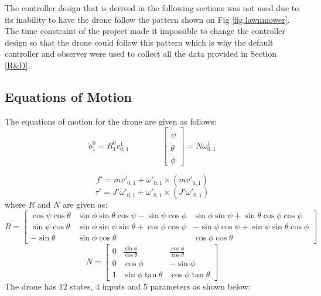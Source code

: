 The controller design that is derived in the following sections was not used due to its inability to have the drone follow the pattern shown on Fig \ref{fig:lawnmower}. The time constraint of the project made it impossible to change the controller design so that the drone could follow this pattern which is why the default controller and observer were used to collect all the data provided in Section \ref{R&D}.

\subsection{Equations of Motion}
The equations of motion for the drone are given as follows:
\begin{equation}
    \label{eqt 1}
    \dot{o}_{1}^{0} = R_{1}^{0}v_{0,1}^{1}
    \qquad\qquad
    \begin{bmatrix}
    \dot{\psi} \\ \dot{\theta} \\ \dot{\phi}
    \end{bmatrix} = N\omega_{0,1}^{1}
\end{equation}

\begin{equation}
    \label{eqt 2}
    f' = m\dot{v}'_{0,1} + \omega'_{0,1}\times (mv'_{0,1})
\end{equation}
\begin{equation}
    \label{eqt 3}
    \tau' = J'\dot{\omega}'_{0,1} + \omega'_{0,1}\times (J'\omega'_{0,1})
\end{equation}
where $R$ and $N$ are given as:
\begin{equation}
    R = \begin{bmatrix}
    \cos{\psi}\cos{\theta} & \sin{\phi}\sin{\theta}\cos{\psi}-\sin{\psi}\cos{\phi} & \sin{\phi}\sin{\psi}+\sin{\theta}\cos{\phi}\cos{\psi} \\
    \sin{\psi}\cos{\theta} & 
    \sin{\phi}\sin{\psi}\sin{\theta}+\cos{\phi}\cos{\psi} & -\sin{\phi}\cos{\psi}+\sin{\psi}\sin{\theta}\cos{\phi} \\ 
    -\sin{\theta} & \sin{\phi}\cos{\theta} & \cos{\phi}\cos{\theta}
    \end{bmatrix}
\end{equation}
\begin{equation}
    N = \begin{bmatrix}
    0 & \frac{\sin{\phi}}{\cos{\theta}} & \frac{\cos{\phi}}{\cos{\theta}} \\ 
    0 & \cos{\phi} & -\sin{\phi} \\
    1 & \sin{\phi}\tan{\theta} & \cos{\phi}\tan{\theta}
    \end{bmatrix}
\end{equation}
The drone has $12$ states, $4$ inputs and $5$ parameters as shown below:


